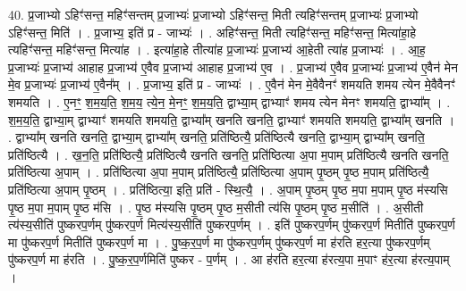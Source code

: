 \documentclass[17pt]{extarticle}
\begin{document}
40. प्र॒जाभ्यो ऽहिꣳ॑सन्त॒ महिꣳ॑सन्तम् प्र॒जाभ्यः॑ प्र॒जाभ्यो ऽहिꣳ॑सन्त॒ मिती त्यहिꣳ॑सन्तम् प्र॒जाभ्यः॑ प्र॒जाभ्यो ऽहिꣳ॑सन्त॒ मिति॑ । . प्र॒जाभ्य॒ इति॑ प्र - जाभ्यः॑ । . अहिꣳ॑सन्त॒ मिती त्यहिꣳ॑सन्त॒ महिꣳ॑सन्त॒ मित्या॑हा॒हे त्यहिꣳ॑सन्त॒ महिꣳ॑सन्त॒ मित्या॑ह । . इत्या॑हा॒हे तीत्या॑ह प्र॒जाभ्यः॑ प्र॒जाभ्य॑ आ॒हेती त्या॑ह प्र॒जाभ्यः॑ । . आ॒ह॒ प्र॒जाभ्यः॑ प्र॒जाभ्य॑ आहाह प्र॒जाभ्य॑ ए॒वैव प्र॒जाभ्य॑ आहाह प्र॒जाभ्य॑ ए॒व । . प्र॒जाभ्य॑ ए॒वैव प्र॒जाभ्यः॑ प्र॒जाभ्य॑ ए॒वैन॑ मेन मे॒व प्र॒जाभ्यः॑ प्र॒जाभ्य॑ ए॒वैन᳚म् । . प्र॒जाभ्य॒ इति॑ प्र - जाभ्यः॑ । . ए॒वैन॑ मेन मे॒वैवैनꣳ॑ शमयति शमय त्येन मे॒वैवैनꣳ॑ शमयति । . ए॒नꣳ॒॒ श॒म॒य॒ति॒ श॒म॒य॒ त्ये॒न॒ मे॒नꣳ॒॒ श॒म॒य॒ति॒ द्वाभ्या॒म् द्वाभ्याꣳ॑ शमय त्येन मेनꣳ शमयति॒ द्वाभ्या᳚म् । . श॒म॒य॒ति॒ द्वाभ्या॒म् द्वाभ्याꣳ॑ शमयति शमयति॒ द्वाभ्या᳚म् खनति खनति॒ द्वाभ्याꣳ॑ शमयति शमयति॒ द्वाभ्या᳚म् खनति । . द्वाभ्या᳚म् खनति खनति॒ द्वाभ्या॒म् द्वाभ्या᳚म् खनति॒ प्रति॑ष्ठित्यै॒ प्रति॑ष्ठित्यै खनति॒ द्वाभ्या॒म् द्वाभ्या᳚म् खनति॒ प्रति॑ष्ठित्यै । . ख॒न॒ति॒ प्रति॑ष्ठित्यै॒ प्रति॑ष्ठित्यै खनति खनति॒ प्रति॑ष्ठित्या अ॒पा म॒पाम् प्रति॑ष्ठित्यै खनति खनति॒ प्रति॑ष्ठित्या अ॒पाम् । . प्रति॑ष्ठित्या अ॒पा म॒पाम् प्रति॑ष्ठित्यै॒ प्रति॑ष्ठित्या अ॒पाम् पृ॒ष्ठम् पृ॒ष्ठ म॒पाम् प्रति॑ष्ठित्यै॒ प्रति॑ष्ठित्या अ॒पाम् पृ॒ष्ठम् । . प्रति॑ष्ठित्या॒ इति॒ प्रति॑ - स्थि॒त्यै॒ । . अ॒पाम् पृ॒ष्ठम् पृ॒ष्ठ म॒पा म॒पाम् पृ॒ष्ठ म॑स्यसि पृ॒ष्ठ म॒पा म॒पाम् पृ॒ष्ठ म॑सि । . पृ॒ष्ठ म॑स्यसि पृ॒ष्ठम् पृ॒ष्ठ म॒सीती त्य॑सि पृ॒ष्ठम् पृ॒ष्ठ म॒सीति॑ । . अ॒सीती त्य॑स्य॒सीति॑ पुष्करप॒र्णम् पु॑ष्करप॒र्ण मित्य॑स्य॒सीति॑ पुष्करप॒र्णम् । . इति॑ पुष्करप॒र्णम् पु॑ष्करप॒र्ण मितीति॑ पुष्करप॒र्ण मा पु॑ष्करप॒र्ण मितीति॑ पुष्करप॒र्ण मा । . पु॒ष्क॒र॒प॒र्ण मा पु॑ष्करप॒र्णम् पु॑ष्करप॒र्ण मा ह॑रति हर॒त्या पु॑ष्करप॒र्णम् पु॑ष्करप॒र्ण मा ह॑रति । . पु॒ष्क॒र॒प॒र्णमिति॑ पुष्कर - प॒र्णम् । . आ ह॑रति हर॒त्या ह॑रत्य॒पा म॒पाꣳ ह॑र॒त्या ह॑रत्य॒पाम् । \newline
\pagebreak
{}
\end{document}
